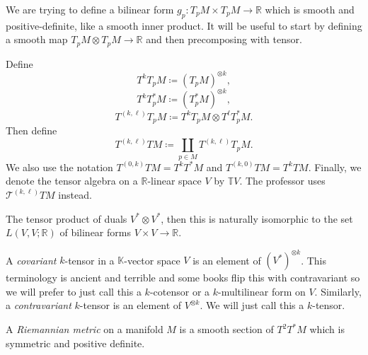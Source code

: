 
We are trying to define a bilinear form $g_p : T_pM \times T_pM \to \mathbb{R} $ which is smooth and positive-definite, like a smooth inner product. It will be useful to start by defining a smooth map $T_pM \otimes T_pM \to \mathbb{R} $ and then precomposing with tensor.
\begin{notation}
	Define
	\[
		T^kT_pM \coloneqq \left( T_pM \right) ^{\otimes k} ,
	\]
	\[
		T^kT_p^*M \coloneqq \left( T_p^*M \right) ^{\otimes k} ,
	\]
	\[
		T^{(k,\ell )} T_pM \coloneqq T^kT_pM \otimes T^\ell T_p^*M
	.\]
	Then define
	\[
		T^{(k,\ell )} TM \coloneqq \coprod_{p\in M} T^{(k,\ell )} T_pM
	.\]
	We also use the notation $T^{(0,k )} TM=T^kT^*M$ and $T^{(k,0)} TM=T^kTM$. Finally, we denote the tensor algebra on a $\mathbb{R} $-linear space $V$ by $\mathbb{T} V$. The professor uses $\mathcal{T} ^{(k,\ell )} TM$ instead.
\end{notation}

The tensor product of duals $V^*\otimes V^*$, then this is naturally isomorphic to the set $L(V,V;\mathbb{R} )$ of bilinear forms $V\times V\to \mathbb{R} $.

\begin{definition}\label{3.1.14}
	A \emph{covariant} $k$-tensor in a $\mathbb{K} $-vector space $V$ is an element of $(V^*)^{\otimes k} $. This terminology is ancient and terrible and some books flip this with contravariant so we will prefer to just call this a $k$-cotensor or a $k$-multilinear form on $V$. Similarly, a \emph{contravariant} $k$-tensor is an element of $V^{\otimes k} $. We will just call this a $k$-tensor.
\end{definition}

\begin{definition}\label{3.1.15}
	A \emph{Riemannian metric} on a manifold $M$ is a smooth section of $T^2T^*M$ which is symmetric and positive definite.
\end{definition}

